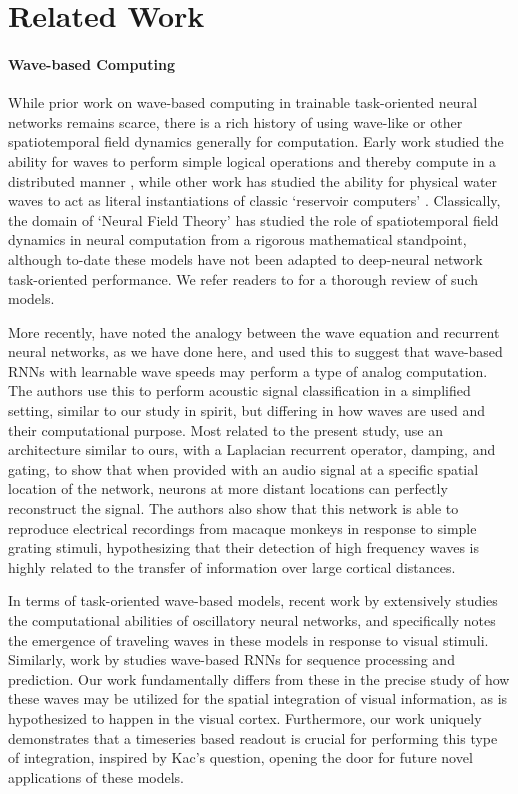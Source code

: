 \section{Related Work}

\paragraph{Wave-based Computing}
While prior work on wave-based computing in trainable task-oriented neural networks remains scarce, there is a rich history of using wave-like or other spatiotemporal field dynamics generally for computation.  
Early work studied the ability for waves to perform simple logical operations and thereby compute in a distributed manner \citep{pwc, wave_compute}, while other work has studied the ability for physical water waves to act as literal instantiations of classic `reservoir computers' \citep{maksymov2023analoguephysicalreservoircomputing}. Classically, the domain of `Neural Field Theory' has studied the role of spatiotemporal field dynamics in neural computation from a rigorous mathematical standpoint, although to-date these models have not been adapted to deep-neural network task-oriented performance. We refer readers to \cite{nft} for a thorough review of such models. 

More recently, \cite{hughes2019wave} have noted the analogy between the wave equation and recurrent neural networks, as we have done here, and used this to suggest that wave-based RNNs with learnable wave speeds may perform a type of analog computation. The authors use this to perform acoustic signal classification in a simplified setting, similar to our study in spirit, but differing in how waves are used and their computational purpose. Most related to the present study, \cite{BALKENHOL20244288} use an architecture similar to ours, with a Laplacian recurrent operator, damping, and gating, to show that when provided with an audio signal at a specific spatial location of the network, neurons at more distant locations can perfectly reconstruct the signal. The authors also show that this network is able to reproduce electrical recordings from macaque monkeys in response to simple grating stimuli, hypothesizing that their detection of high frequency waves is highly related to the transfer of information over large cortical distances.  

In terms of task-oriented wave-based models, recent work by \cite{felix} extensively studies the computational abilities of oscillatory neural networks, and specifically notes the emergence of traveling waves in these models in response to visual stimuli. Similarly, work by \cite{nwm, wrnn} studies wave-based RNNs for sequence processing and prediction. Our work fundamentally differs from these in the precise study of how these waves may be utilized for the spatial integration of visual information, as is hypothesized to happen in the visual cortex. Furthermore, our work uniquely demonstrates that a timeseries based readout is crucial for performing this type of integration, inspired by Kac's question, opening the door for future novel applications of these models. 

